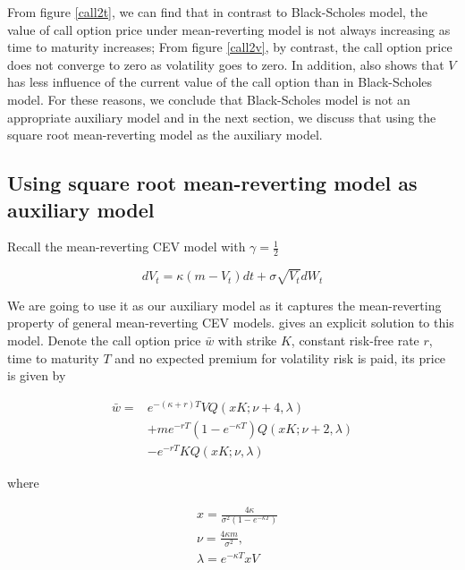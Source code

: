 From figure \ref{call2t}, we can find that in contrast to Black-Scholes model, the value of call option price under mean-reverting model is not always increasing as time to maturity increases; From figure \ref{call2v}, by contrast, the call option price does not converge to zero as volatility goes to zero. In addition, \cite{grunbichler_valuing_1996} also shows that $V$ has less influence of the current value of the call option than in Black-Scholes model. For these reasons, we conclude that Black-Scholes model is not an appropriate auxiliary model and in the next section, we discuss that using the square root mean-reverting model as the auxiliary model.

\subsection{Using square root mean-reverting model as auxiliary model}

Recall the mean-reverting CEV model with $\gamma=\frac{1}{2}$

\begin{equation}
    d V_t=\kappa(m - V_t) d t+\sigma \sqrt{V_t} d W_t
\end{equation}

We are going to use it as our auxiliary model as it captures the mean-reverting property of general mean-reverting CEV models. \cite{grunbichler_valuing_1996} gives an explicit solution to this model. Denote the call option price $\bar{w}$ with strike $K$, constant risk-free rate $r$, time to maturity $T$ and no expected premium for volatility risk is paid, its price is given by

\begin{equation}\label{aux call price}
    \begin{aligned}
        \bar{w}=&  e^{ -(\kappa+r) T} V Q(x K ; \nu+4, \lambda) \\
        &+ m e^{-r T}(1-e^{-\kappa T}) Q(xK ; \nu+2, \lambda) \\
        &-e^{-r T} K Q(x K; \nu, \lambda)
        \end{aligned}
\end{equation}

\noindent where

$$
\begin{aligned}
    &x=\frac{4 \kappa}{\sigma^{2}(1-e^{-\kappa T})} \\
    &\nu=\frac{4 \kappa m}{\sigma^{2}}, \\
    &\lambda= e^{-\kappa T}x V
    \end{aligned}
$$

